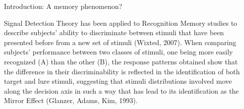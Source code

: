 \documentclass[final]{beamer}
\newlength{\sepwid}
\newlength{\onecolwid}
\begin{document}
\begin{frame}[t]



\begin{columns}[t] %
\begin{column}{\sepwid}\end{column} %
\begin{column}{\onecolwid} %




\begin{alertblock}{Introduction: A memory phenomenon?}

Signal Detection Theory has been applied to Recognition Memory studies to describe subjects’ ability to discriminate between stimuli that have been presented before from a new set of stimuli (Wixted, 2007). When comparing subjects' performance between two classes of stimuli, one being more easily recognized (A) than the other (B), the response patterns obtained show that the difference in their discriminability is reflected in the identification of both target and lure stimuli, suggesting that stimuli distributions involved move along the decision axis in such a way that has lead to its identification as the Mirror Effect (Glanzer, Adams, Kim, 1993).



\end{alertblock}
\end{column}
\end{columns}
\end{frame}
\end{document}
